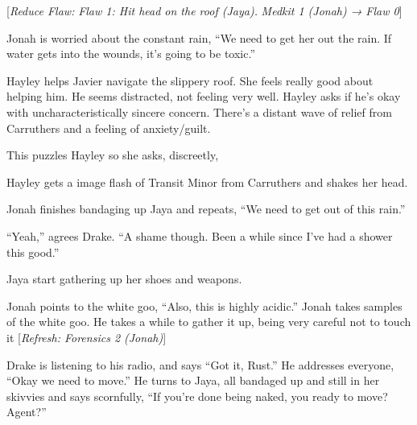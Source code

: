 {[}\textit{Reduce Flaw: }\textit{ {\color[RGB]{255,0,0}Flaw 1: Hit head on the roof (Jaya).} }\textit{  Medkit 1 (Jonah) → Flaw 0}{]}

Jonah is worried about the constant rain, ``We need to get her out the rain.  If water gets into the wounds, it's going to be toxic.''



Hayley helps Javier navigate the slippery roof.  She feels really good about helping him.  He seems distracted, not feeling very well.  Hayley asks if he's okay with uncharacteristically sincere concern.  There's a distant wave of relief from Carruthers and a feeling of anxiety/guilt.

This puzzles Hayley so she asks, discreetly,    {\color[RGB]{255,153,0} } 


Hayley gets a image flash of Transit Minor from Carruthers and shakes her head.     {\color[RGB]{255,153,0} } 


   {\color[RGB]{255,153,0} } 




Jonah finishes bandaging up Jaya and repeats, ``We need to get out of this rain.''

``Yeah,'' agrees Drake.  ``A shame though.  Been a while since I've had a shower this good.''

Jaya start gathering up her shoes and weapons.

Jonah points to the white goo, ``Also, this is highly acidic.''  Jonah takes samples of the white goo.  He takes a while to gather it up, being very careful not to touch it {[}\textit{Refresh: Forensics 2 (Jonah)}{]}

Drake is listening to his radio, and says ``Got it, Rust.''  He addresses everyone, ``Okay we need to move.''  He turns to Jaya, all bandaged up and still in her skivvies and says scornfully, ``If you're done being naked, you ready to move?  Agent?''



